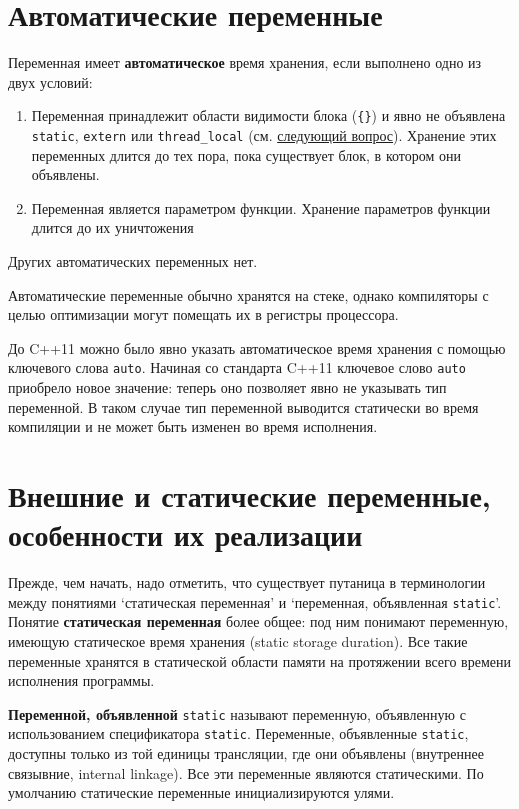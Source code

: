 \documentclass[14pt, a4paper]{extarticle}
\begin{document}
\section{Автоматические переменные}
Переменная имеет \textbf{автоматическое} время хранения, если выполнено одно из двух условий:
\label{def:auto_storage}
\begin{enumerate}
  \item Переменная принадлежит области видимости блока (\verb|{}|) и явно не объявлена \verb|static|, \verb|extern| или \verb|thread_local|
  (см. \hyperref[sec:ext_stat]{следующий вопрос}).
  Хранение этих переменных длится до тех пора, пока существует блок, в котором они объявлены.
  \item Переменная является параметром функции. Хранение параметров функции длится до их уничтожения
\end{enumerate}
Других автоматических переменных нет.

Автоматические переменные обычно хранятся на стеке, однако компиляторы с целью
оптимизации могут помещать их в регистры процессора.

До C++11 можно было явно указать автоматическое время хранения с помощью
ключевого слова \verb|auto|. Начиная со стандарта C++11 ключевое слово
\verb|auto| приобрело новое значение: теперь оно позволяет явно не указывать
тип переменной. В таком случае тип переменной выводится статически во время
компиляции и не может быть изменен во время исполнения.

\section{Внешние и статические переменные, особенности их реализации}
\label{sec:ext_stat}
Прежде, чем начать, надо отметить, что существует путаница в терминологии
между понятиями `статическая переменная' и `переменная, объявленная \verb|static|'.
Понятие \textbf{статическая переменная} более общее: под ним понимают переменную,
имеющую статическое время хранения (static storage duration). Все такие переменные
хранятся в статической области памяти на протяжении всего времени исполнения программы.

\textbf{Переменной, объявленной} \verb|static| называют переменную, объявленную с использованием
спецификатора \verb|static|. Переменные, объявленные \verb|static|, доступны только
из той единицы трансляции, где они объявлены (внутреннее связывние, internal linkage).
Все эти переменные являются статическими. По умолчанию статические переменные инициализируются
улями.
\end{document}
